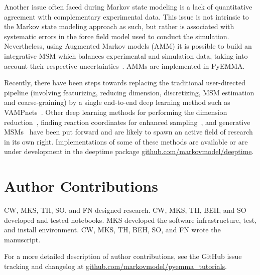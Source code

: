 \documentclass[9pt,tutorial]{livecoms}
\newcommand{\githubrepository}{\url{github.com/markovmodel/pyemma_tutorials}}
\begin{document}
Another issue often faced during Markov state modeling is a lack of quantitative agreement with complementary experimental data. 
This issue is not intrinsic to the Markov state modeling approach as such,
but rather is associated with systematic errors in the force field model used to conduct the simulation. 
Nevertheless, using Augmented Markov models (AMM) it is possible to build an integrative MSM which balances experimental and simulation data,
taking into account their respective uncertainties~\cite{simon-amm}. 
AMMs are implemented in PyEMMA.  

Recently, there have been steps towards replacing the traditional user-directed pipeline (involving featurizing,
reducing dimension, discretizing, MSM estimation and coarse-graining) by a single end-to-end deep learning method such as VAMPnets~\cite{vampnet}.
Other deep learning methods for performing the dimension reduction~\cite{tae},
finding reaction coordinates for enhanced sampling~\cite{hernandez-vde,Sultan2018-vde-enhanced-sampling,Ribeiro2018-rave},
and generative MSMs~\cite{deep-gen-msm-preprint} have been put forward and are likely to spawn an active field of research in its own right.
Implementations of some of these methods are available or are under development in the deeptime package \url{github.com/markovmodel/deeptime}. 

\section{Author Contributions}
%
CW, MKS, TH, SO, and FN designed research.
CW, MKS, TH, BEH, and SO developed and tested notebooks.
MKS developed the software infrastructure, test, and install environment.
CW, MKS, TH, BEH, SO, and FN wrote the manuscript.

For a more detailed description of author contributions, see the GitHub issue tracking and changelog at \githubrepository{}.
\end{document}
